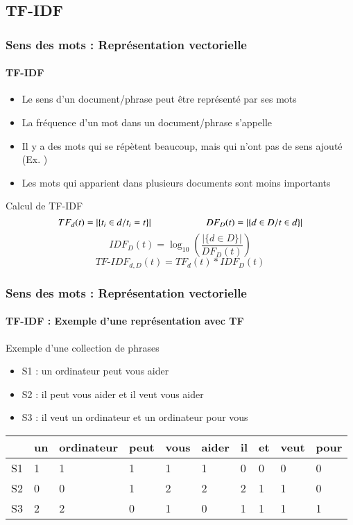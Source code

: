 \documentclass[xcolor=table]{beamer}
\begin{document}
\subsection{TF-IDF}

\begin{frame}
\frametitle{Sens des mots : Représentation vectorielle}
\framesubtitle{TF-IDF}

\begin{itemize}
	\item Le sens d'un document/phrase peut être représenté par ses mots 
	\item La fréquence d'un mot dans un document/phrase s'appelle 
	\item Il y a des mots qui se répètent beaucoup, mais qui n'ont pas de sens ajouté (Ex. )
	\item Les mots qui apparient dans plusieurs documents sont moins importants
\end{itemize}

\begin{block}{Calcul de TF-IDF}
	\[
	TF_d(t) =  |\{t_i \in d / t_i = t\}|
	\hskip2cm 
	DF_D(t) = |\{d \in D / t \in d\}|
	\]
	\[IDF_D(t) = \log_{10} \left( \frac{|\{d \in D\}|}{DF_D(t)} \right)\]
	\[TF\text{-}IDF_{d, D}(t) = TF_d(t) * IDF_D(t)\]
\end{block}

\end{frame}


\begin{frame}
\frametitle{Sens des mots : Représentation vectorielle}
\framesubtitle{TF-IDF : Exemple d'une représentation avec TF}

\begin{exampleblock}{Exemple d'une collection de phrases}
	\begin{itemize}
		\item S1 : un ordinateur peut vous aider
		\item S2 : il peut vous aider et il veut vous aider
		\item S3 : il veut un ordinateur et un ordinateur pour vous
	\end{itemize}
\end{exampleblock}

\begin{center}
	\begin{tabular}{llllllllll}
	\hline\hline
	& un & ordinateur & peut & vous & aider & il & et & veut & pour \\
	\hline
	S1 & 1 & 1 & 1 & 1 & 1 & 0 & 0 & 0 & 0\\
	S2 & 0 & 0 & 1 & 2 & 2 & 2 & 1 & 1 & 0\\
	S3 & 2 & 2 & 0 & 1 & 0 & 1 & 1 & 1 & 1\\
	\hline\hline
\end{tabular}
\end{center}

\end{frame}
\end{document}
